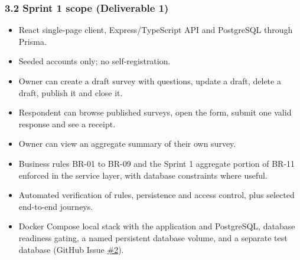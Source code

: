 \documentclass[12pt,a4paper]{article}
\begin{document}
\subsubsection*{3.2 Sprint 1 scope (Deliverable 1)}
\begin{itemize}[leftmargin=*]
\item React single-page client, Express/TypeScript API and PostgreSQL through Prisma.
\item Seeded accounts only; no self-registration.
\item Owner can create a draft survey with questions, update a draft, delete a draft, publish it and close it.
\item Respondent can browse published surveys, open the form, submit one valid response and see a receipt.
\item Owner can view an aggregate summary of their own survey.
\item Business rules BR-01 to BR-09 and the Sprint 1 aggregate portion of BR-11 enforced in the service layer, with database constraints where useful.
\item Automated verification of rules, persistence and access control, plus selected end-to-end journeys.
\item Docker Compose local stack with the application and PostgreSQL, database readiness gating, a named persistent database volume, and a separate test database (GitHub Issue \href{https://github.com/Snnn3/SurveyHub/issues/2}{\#2}).
\end{itemize}

\end{document}
